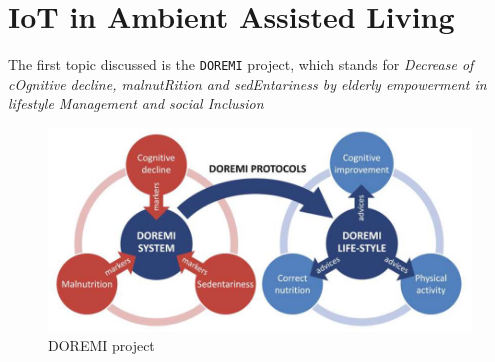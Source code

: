 \section{IoT in Ambient Assisted Living}

The first topic discussed is the \texttt{DOREMI} project, which stands for \textit{Decrease of cOgnitive decline, malnutRition and sedEntariness by elderly empowerment in lifestyle Management and social Inclusion}

\begin{figure}[htbp]
   \centering
   \includegraphics{images/doremi_outline.png}
   \caption{DOREMI project}
   \label{fig:doremi_outline}
\end{figure}

